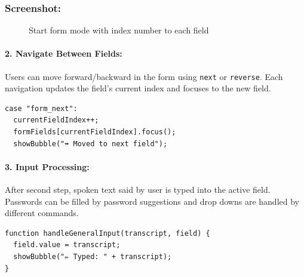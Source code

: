 \subsubsection*{Screenshot:}
\begin{figure}[H] 
    \centering
    \caption{Start form mode with index number to each field}
    \label{fig:start_form}
\end{figure}

\paragraph{2. Navigate Between Fields:}
Users can move forward/backward in the form using \texttt{next} or \texttt{reverse}. Each navigation updates the field's current index and focuses to the new field.

\begin{verbatim}
case "form_next":
  currentFieldIndex++;
  formFields[currentFieldIndex].focus();
  showBubble("➡️ Moved to next field");
\end{verbatim}

\paragraph{3. Input Processing:}
After second step, spoken text said by user is typed into the active field. Passwords can be filled by password suggestions and drop downs are handled by different commands.

\begin{verbatim}
function handleGeneralInput(transcript, field) {
  field.value = transcript;
  showBubble("✏️ Typed: " + transcript);
}
\end{verbatim}

